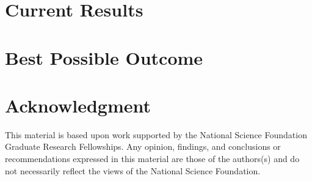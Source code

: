 \documentclass[letterpaper,twocolumn]{article}
\begin{document}
\section{Current Results}

\section{Best Possible Outcome}

\section*{Acknowledgment}
This material is based upon work supported by the National Science Foundation Graduate Research Fellowships. Any opinion, findings, and conclusions or recommendations expressed in this material are those of the authors(s) and do not necessarily reflect the views of the National Science Foundation.



\end{document}
